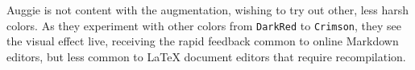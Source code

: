 

Auggie is not content with the augmentation, wishing to try out other, less harsh colors. As they experiment with other colors from \texttt{DarkRed} to \texttt{Crimson}, they see the visual effect live, 
receiving the rapid feedback common to online Markdown editors, but less common to LaTeX document editors that require recompilation. \\[-1ex]

